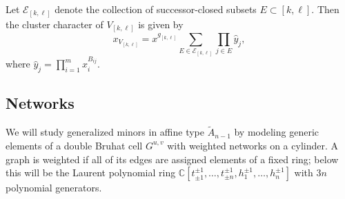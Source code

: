 \documentclass[12pt]{amsart}
\newcommand{\CC}{\mathbb{C}}
\newcommand{\cE}{\mathcal{E}}
\theoremstyle{remark}
\numberwithin{equation}{section}
\begin{document}
Let $\cE_{[k,\ell]}$ denote the collection of successor-closed subsets $E \subset [k,\ell]$.  Then the cluster character of $V_{[k,\ell]}$ is given by
\begin{equation}\label{eq:regular cluster characters}
  x_{V_{[k,\ell]}} = x^{g_{[k,\ell]}} \sum_{E \in \cE_{[k,\ell]}} \prod_{j \in E} \hat{y}_j,
\end{equation}
where $\hat y_j=\prod_{i=1}^m x_i^{B_{ij}}$.


\subsection{Networks}

We will study generalized minors in affine type $\tilde A_{n-1}$ by modeling generic elements of a double Bruhat cell $G^{u,v}$ with weighted networks on a cylinder. 
A graph is weighted if all of its edges are assigned elements of a fixed ring; below this will be the Laurent polynomial ring $\CC[t_{\pm1}^{\pm1},\dotsc,t_{\pm n}^{\pm1},h_1^{\pm1},\dotsc,h_n^{\pm1}]$ with $3n$ polynomial generators.
\end{document}
